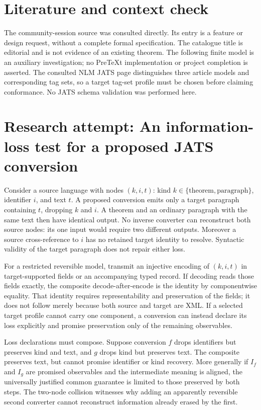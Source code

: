 \documentclass[11pt]{article}
\begin{document}
\section{Literature and context check}
The community-session source was consulted directly. Its entry is a feature or design request, without a complete formal specification. The catalogue title is editorial and is not evidence of an existing theorem. The following finite model is an auxiliary investigation; no PreTeXt implementation or project completion is asserted. The consulted NLM JATS page distinguishes three article models and corresponding tag sets, so a target tag-set profile must be chosen before claiming conformance. No JATS schema validation was performed here.
\section{Research attempt: An information-loss test for a proposed JATS conversion}
Consider a source language with nodes $(k,i,t)$: kind $k\in\{\text{theorem},\text{paragraph}\}$, identifier $i$, and text $t$. A proposed conversion emits only a target paragraph containing $t$, dropping $k$ and $i$. A theorem and an ordinary paragraph with the same text then have identical output. No inverse converter can reconstruct both source nodes: its one input would require two different outputs. Moreover a source cross-reference to $i$ has no retained target identity to resolve. Syntactic validity of the target paragraph does not repair either loss.

For a restricted reversible model, transmit an injective encoding of $(k,i,t)$ in target-supported fields or an accompanying typed record. If decoding reads those fields exactly, the composite decode-after-encode is the identity by componentwise equality. That identity requires representability and preservation of the fields; it does not follow merely because both source and target are XML. If a selected target profile cannot carry one component, a conversion can instead declare its loss explicitly and promise preservation only of the remaining observables.

Loss declarations must compose. Suppose conversion $f$ drops identifiers but preserves kind and text, and $g$ drops kind but preserves text. The composite preserves text, but cannot promise identifier or kind recovery. More generally if $I_f$ and $I_g$ are promised observables and the intermediate meaning is aligned, the universally justified common guarantee is limited to those preserved by both steps. The two-node collision witnesses why adding an apparently reversible second converter cannot reconstruct information already erased by the first.
\end{document}
